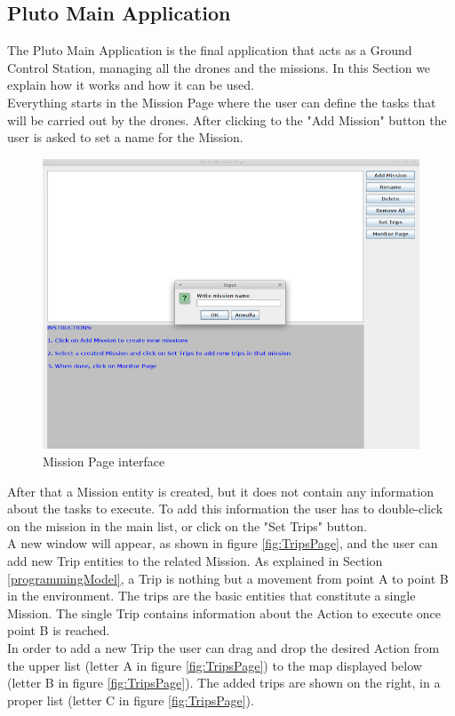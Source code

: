 \subsection{Pluto Main Application}
\label{plutoMainApp}

The Pluto Main Application is the final application that acts as a Ground Control Station, managing all the drones and the missions.
In this Section we explain how it works and how it can be used.
\\
Everything starts in the Mission Page where the user can define the tasks that will be carried out by the drones. After clicking to the "Add Mission" button the user is asked to set a name for the Mission.

\begin{figure}[H]
  \centering
  \includegraphics[width=\linewidth]{pictures/MissionPage.png}
  \caption{Mission Page interface}
  \label{fig:MissionPage}
\end{figure}

After that a Mission entity is created, but it does not contain any information about the tasks to execute. 
To add this information the user has to double-click on the mission in the main list, or click on the "Set Trips" button.
\\
A new window will appear, as shown in figure \ref{fig:TripsPage}, and the user can add new Trip entities to the related Mission.
As explained in Section \ref{programmingModel}, a Trip is nothing but a movement from point A to point B in the environment. 
The trips are the basic entities that constitute a single Mission. 
The single Trip contains information about the Action to execute once point B is reached.
\\
In order to add a new Trip the user can drag and drop the desired Action from the upper list (letter A in figure \ref{fig:TripsPage}) to the map displayed below (letter B in figure \ref{fig:TripsPage}).
The added trips are shown on the right, in a proper list (letter C in figure \ref{fig:TripsPage}).

